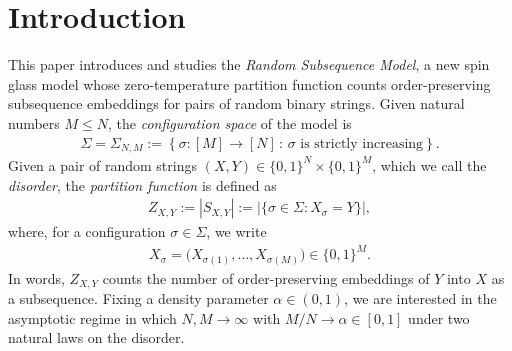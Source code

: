 \documentclass[11pt]{amsart}
\numberwithin{equation}{section}
\numberwithin{equation}{section}
\newcommand{\1}{\mathbbm{1}}
\theoremstyle{definition}
\begin{document}
\begin{abstract}
    In the regime where $N,M\to\infty$ at a fixed ratio $\alpha = M/N \in (0,1)$, we exhibit strict asymptotic separations between the null annealed free energy and the quenched free energies of the null and planted models at all values of the density parameter $\alpha$. This suggests that these models are in a spin glass phase at zero temperature throughout the entire dense regime. As a consequence, we show that uniformly-random codes achieve a positive rate in the deletion channel for all deletion probabilities $p\in [0,1),$ settling multiple conjectures of \cite{pernice2024mutual} and proving the first such positive rate result for the regime $p \geq 1/2$.
    
    We also give an exact analytic formula for the annealed free energy of the planted model for all values of the density parameter. This implies a corresponding analytic upper bound on the best rate achievable by uniformly-random codes in the deletion channel, complementing the lower bound from our first result. Our upper and lower bounds for the capacity of the deletion channel under uniform codes are far closer to each other than the best known upper and lower bounds for the capacity of the deletion channel.
\end{abstract}

\maketitle


\section{Introduction}

This paper introduces and studies the \textit{Random Subsequence Model}, a new spin glass model whose zero-temperature partition function counts order-preserving subsequence embeddings for pairs of random binary strings. Given natural numbers $M \leq N$, the \textit{configuration space} of the model is
\begin{align*}
    \Sigma = \Sigma_{N,M} := \left\{\sigma : [M] \to [N] \,:\, \sigma \text{ is strictly increasing} \right\}.
\end{align*}
Given a pair of random strings $(X,Y) \in \{0,1\}^N\times \{0,1\}^M$, which we call the \textit{disorder}, the \textit{partition function} is defined as
\begin{align} \label{eq:Z-defn}
    Z_{X,Y} := |S_{X,Y}| := |\{\sigma\in\Sigma : X_\sigma=Y\}|,
\end{align}
where, for a configuration $\sigma \in \Sigma$, we write 
\begin{align*}
    X_\sigma = \big( X_{\sigma(1)},\dots,X_{\sigma(M)} \big) \in \{0,1\}^M.
\end{align*} 
In words, $Z_{X,Y}$ counts the number of order-preserving embeddings of \(Y\) into \(X\) as a subsequence. Fixing a density parameter $\alpha \in (0,1)$, we are interested in the asymptotic regime in which \(N,M\to\infty\) with \(M/N\to\alpha\in[0,1]\) under two natural laws on the disorder. 
\end{document}
